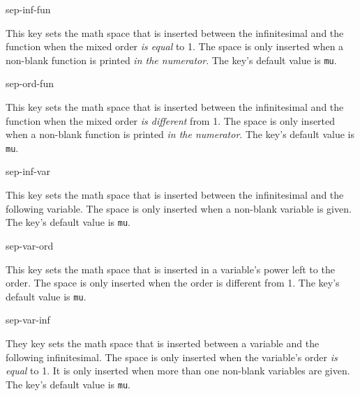 \documentclass[final,british,10pt]{scrartcl}
\theoremstyle{remark}
\begin{document}
	\begin{option}{sep-inf-fun}
		\begin{values}[default = 0]
		\end{values}
		This key sets the math space that is inserted between the infinitesimal and the function when the mixed order \emph{is equal} to \num{1}. The space is only inserted when a non-blank function is printed \emph{in the numerator}. The key's default value is  \texttt{mu}.
	\end{option}
	
	\begin{option}{sep-ord-fun}
		\begin{values}[default = 0]
		\end{values}
		This key sets the math space that is inserted between the infinitesimal and the function when the mixed order \emph{is different} from \num{1}. The space is only inserted when a non-blank function is printed \emph{in the numerator}. The key's default value is  \texttt{mu}.
	\end{option}
	
	\begin{option}{sep-inf-var}
		\begin{values}[default = 0]
		\end{values}
		This key sets the math space that is inserted between the infinitesimal and the following variable. The space is only inserted when a non-blank variable is given. The key's default value is  \texttt{mu}.
	\end{option}
	
	\begin{option}{sep-var-ord}
		\begin{values}[default = 0]
		\end{values}
		This key sets the math space that is inserted in a variable's power left to the order. The space is only inserted when the order is different from \num{1}. The key's default value is  \texttt{mu}.
	\end{option}
	
	\begin{option}{sep-var-inf}
		\begin{values}[default = 3]
		\end{values}
		They key sets the math space that is inserted between a variable and the following infinitesimal. The space is only inserted when the variable's order \emph{is equal} to \num{1}. It is only inserted when more than one non-blank variables are given. The key's default value is  \texttt{mu}.
	\end{option}
	
\end{document}
